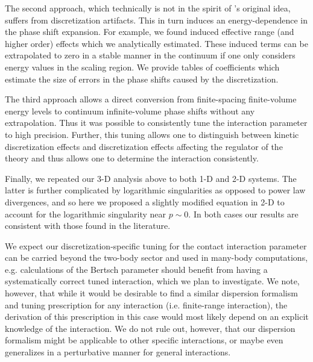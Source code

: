The second approach, which technically is not in the spirit of \Luscher's original idea, suffers from discretization artifacts.  This in turn induces an energy-dependence in the phase shift expansion.
For example, we found induced effective range (and higher order) effects which we analytically estimated.
These induced terms can be extrapolated to zero in a stable manner in the continuum if one only considers energy values in the scaling region.
We provide tables of coefficients which estimate the size of errors in the phase shifts caused by the discretization.

The third approach allows a direct conversion from finite-spacing finite-volume energy levels to continuum infinite-volume phase shifts without any extrapolation.
Thus it was possible to consistently tune the interaction parameter to high precision.  Further, this tuning allows one to distinguish between kinetic discretization effects and discretization effects affecting the regulator of the theory and thus allows one to determine the interaction consistently.

Finally, we repeated our 3-D analysis above to both 1-D and 2-D systems.  The latter is further complicated by logarithmic singularities as opposed to power law divergences, and so here we proposed a slightly modified \Luscher equation in 2-D to account for the logarithmic singularity near $p\sim 0$.  In both cases our results are consistent with those found in the literature.

We expect our discretization-specific tuning for the contact interaction parameter can be carried beyond the two-body sector and used in many-body computations, e.g. calculations of the Bertsch parameter should benefit from having a systematically correct tuned interaction, which we plan to investigate.
We note, however, that while it would be desirable to find a similar dispersion formalism and tuning prescription for any interaction (i.e. finite-range interaction), the derivation of this prescription in this case would most likely depend on an explicit knowledge of the interaction.
We do not rule out, however, that our dispersion formalism might be applicable to other specific interactions, or maybe even generalizes in a perturbative manner for general interactions.  %


